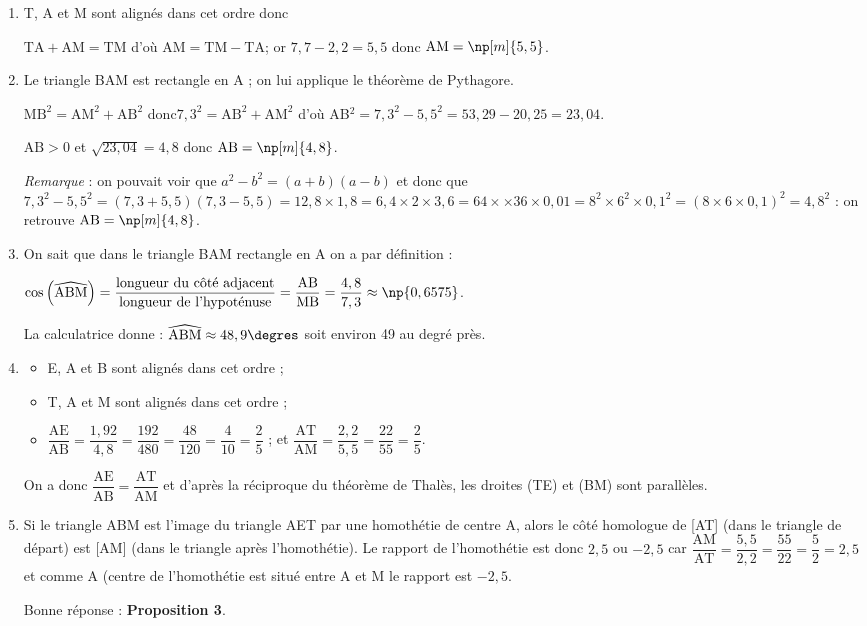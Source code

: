 \begin{enumerate}
\item T, A et M sont alignés dans cet ordre donc

$\mathrm{TA} + \mathrm{AM} = \mathrm{TM}$ d'où $\mathrm{AM} = \mathrm{TM} - \mathrm{TA}$; or $7,7 - 2,2 = 5,5$ donc $\mathrm{AM} =  \np[m]{5,5}$.

\item Le triangle BAM est rectangle en A ; on lui applique le théorème de Pythagore.

$\mathrm{MB}^2 = \mathrm{AM}^2+\mathrm{AB}^2$ \quad donc\quad  $7,3^2  = \mathrm{AB}^2 + \mathrm{AM}^2 $ d'où AB$^2 = 7,3^2 - 5,5^2 = 53,29 - 20,25  = 23,04$.

$\mathrm{AB}>0$ \quad et \quad $\sqrt{23,04}=4,8$ \quad donc \quad  $\mathrm{AB} = \np[m]{4,8}$.

\emph{Remarque} : on pouvait voir que $a^2 - b^2 = (a + b)(a - b)$ et donc que
$7,3^2 - 5,5^2 = (7,3 + 5,5)(7,3 - 5,5) = 12,8 \times 1,8 = 6,4 \times 2 \times 3,6 = 64 \times \times 36 \times 0,01 = 8^2 \times 6^2 \times 0,1^2= (8 \times 6 \times 0,1)^2 = 4,8^2$ : on retrouve $\mathrm{AB} = \np[m]{4,8}$.

\item On sait que  dans le triangle BAM  rectangle en A on a par définition :

$\cos\left(\widehat{\text{ABM}}\right) = \dfrac{\text{longueur du côté adjacent}}{\text{longueur de l'hypoténuse}} = \dfrac{\text{AB}}{\text{MB}} = \dfrac{4,8}{7,3}  \approx \np{0,6575}$.

La calculatrice donne : $\widehat{\text{ABM}}\approx 48,9\degres$ soit environ 49\degres{} au degré près.

	\item \begin{itemize}
		\item E, A et B sont alignés dans cet ordre ;
		\item T, A et M sont alignés dans cet ordre ;
		\item $\dfrac{\mathrm{AE}}{\mathrm{AB}} = \dfrac{1,92}{4,8} = \dfrac{192}{480} = \dfrac{48}{120} = \dfrac{4}{10} = \dfrac25$ ; et $\dfrac{\mathrm{AT}}{\mathrm{AM}} = \dfrac{2,2}{5,5} = \dfrac{22}{55} = \dfrac25$.
	\end{itemize}

On a donc $\dfrac{\mathrm{AE}}{\mathrm{AB}} = \dfrac{\mathrm{AT}}{\mathrm{AM}}$ et d'après
 la réciproque du théorème de Thalès, les droites (TE) et (BM) sont parallèles.
	\item Si le triangle ABM est l'image du triangle AET par une homothétie de centre A, alors le côté homologue de [AT] (dans le triangle de départ) est [AM] (dans le triangle après l'homothétie). Le rapport de l'homothétie est donc $2,5$ ou $- 2,5$ car $\dfrac{\text{AM}}{\text{AT}} = \dfrac{5,5}{2,2} = \dfrac{55}{22} = \dfrac52 = 2,5$ et comme A (centre de l'homothétie est situé entre A et M le rapport est $- 2,5$.

Bonne réponse : \textbf{Proposition 3}.
\end{enumerate}

